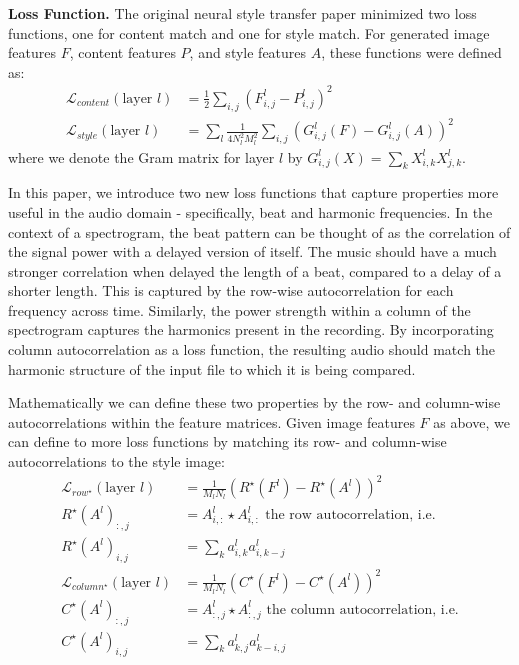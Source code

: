 \documentclass{article}
\begin{document}
\textbf{Loss Function.} \hspace{0.25cm} The original neural style transfer paper minimized two loss functions, one for content match and one for style match. For generated image features $F$, content features $P$, and style features $A$, these functions were defined as:
\begin{align*}
\mathcal{L}_{content}(\text{layer } l) &= \frac{1}{2} \sum_{i, j} (F_{i, j}^{l} - P_{i, j}^{l})^2 \\
\mathcal{L}_{style}(\text{layer } l) &= \sum_l \frac{1}{4N_l^2M_l^2}\sum_{i,j}(G_{i,j}^l(F) - G_{i,j}^l(A))^2
\end{align*}
where we denote the Gram matrix for layer $l$ by $G_{i,j}^l(X) = \sum_k X_{i,k}^l X_{j,k}^l$. 

In this paper, we introduce two new loss functions that capture properties more useful in the audio domain - specifically, beat and harmonic frequencies. In the context of a spectrogram, the beat pattern can be thought of as the correlation of the signal power with a delayed version of itself. The music should have a much stronger correlation when delayed the length of a beat, compared to a delay of a shorter length. This is captured by the row-wise autocorrelation for each frequency across time. Similarly, the power strength within a column of the spectrogram captures the harmonics present in the recording. By incorporating column autocorrelation as a loss function, the resulting audio should match the harmonic structure of the input file to which it is being compared.

Mathematically we can define these two properties by the row- and column-wise autocorrelations within the feature matrices. Given image features $F$ as above, we can define to more loss functions by matching its row- and column-wise autocorrelations to the style image:
\begin{align*}
\mathcal{L}_{row^\star}(\text{layer } l) &= \frac{1}{M_lN_l} (R^\star(F^l) - R^\star(A^l))^2 \\
R^\star(A^l)_{:,j} &= A_{i,:}^l \star A_{i,:}^l \text{ the row autocorrelation, i.e.} \\
R^\star(A^l)_{i,j} &= \sum_k a_{i,k}^la_{i,k-j}^l \\
\mathcal{L}_{column^\star}(\text{layer } l) &= \frac{1}{M_lN_l} (C^\star(F^l) - C^\star(A^l))^2 \\
C^\star(A^l)_{:,j} &= A_{:,j}^l \star A_{:,j}^l \text{ the column autocorrelation, i.e.} \\
C^\star(A^l)_{i,j} &= \sum_k a_{k,j}^la_{k-i,j}^l \\
\end{align*}
\end{document}
